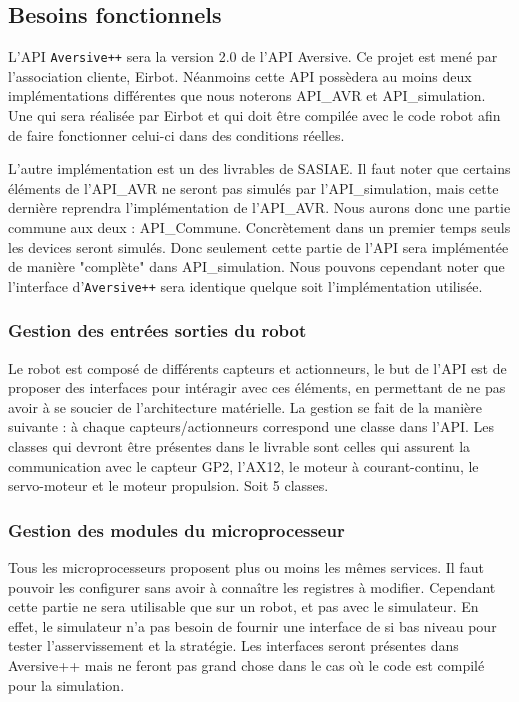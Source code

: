 
\subsection{Besoins fonctionnels}

L'API \texttt{Aversive++} sera la version 2.0 de l'API Aversive. Ce projet est mené par l'association cliente, Eirbot. Néanmoins cette API possèdera au moins deux implémentations différentes que nous noterons API\_AVR et API\_simulation. Une qui sera réalisée par Eirbot et qui doit être compilée avec le code robot afin de faire fonctionner celui-ci dans des conditions réelles. 

L'autre implémentation est un des livrables de SASIAE. Il faut noter que certains éléments de l'API\_AVR ne seront pas simulés par l'API\_simulation, mais cette dernière reprendra l'implémentation de l'API\_AVR. Nous aurons donc une partie commune aux deux : API\_Commune. 
Concrètement dans un premier temps seuls les devices seront simulés. Donc seulement cette partie de l'API sera implémentée de manière "complète" dans API\_simulation. Nous pouvons cependant noter que l'interface d'\texttt{Aversive++} sera %
identique quelque soit l'implémentation utilisée.

\subsubsection{Gestion des entrées sorties du robot}

Le robot est composé de différents capteurs et actionneurs, le but de l'API est de proposer des interfaces pour intéragir avec ces éléments, en permettant de ne pas avoir à se soucier de l'architecture matérielle. La gestion se fait de la manière suivante : à chaque capteurs/actionneurs correspond une classe dans l'API. Les classes qui devront être présentes dans le livrable sont celles qui assurent la communication avec le capteur GP2, l'AX12, le moteur à courant-continu, le servo-moteur et le moteur propulsion.
Soit 5 classes.

\subsubsection{Gestion des modules du microprocesseur}

Tous les microprocesseurs proposent plus ou moins les mêmes services. Il faut pouvoir les configurer sans avoir à connaître les registres à modifier. Cependant cette partie ne sera utilisable que sur un robot, et pas avec le simulateur. En effet, le simulateur n'a pas besoin de fournir une interface de si bas niveau pour tester l'asservissement et la stratégie. Les interfaces seront présentes dans Aversive++ mais ne feront pas grand chose dans le cas où le code est compilé pour la simulation.

